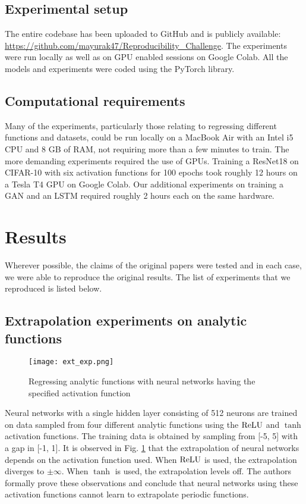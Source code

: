 \subsection{Experimental setup}

The entire codebase has been uploaded to GitHub and is publicly available: \url{https://github.com/mayurak47/Reproducibility_Challenge}. The experiments were run locally as well as on GPU enabled sessions on Google Colab. All the models and experiments were coded using the PyTorch library.

\subsection{Computational requirements}

Many of the experiments, particularly those relating to regressing different functions and datasets, could be run locally on a MacBook Air with an Intel i5 CPU and 8 GB of RAM, not requiring more than a few minutes to train. The more demanding experiments required the use of GPUs. Training a ResNet18 on CIFAR-10 with six activation functions for 100 epochs took roughly 12 hours on a Tesla T4 GPU on Google Colab. Our additional experiments on training a GAN and an LSTM required roughly 2 hours each on the same hardware. 

\section{Results}

Wherever possible, the claims of the original papers were tested and in each case, we were able to reproduce the original results. The list of experiments that we reproduced is listed below.

\subsection{Extrapolation experiments on analytic functions}

\begin{figure}[h]

\centering
\texttt{[image: ext\_exp.png]}
\caption{Regressing analytic functions with neural networks having the specified activation function}
\label{fig:extrapolation}
\end{figure}

Neural networks with a single hidden layer consisting of 512 neurons are trained on data sampled from four different analytic functions using the $ \operatorname{ReLU} $ and $ \tanh $ activation functions. The training data is obtained by sampling from [-5, 5] with a gap in [-1, 1]. It is observed in Fig. \ref{fig:extrapolation} that the extrapolation of neural networks depends on the activation function used. When $ \operatorname{ReLU} $ is used, the extrapolation diverges to $\pm \infty$. When $ \tanh $ is used, the extrapolation levels off. The authors formally prove these observations and conclude that neural networks using these activation functions cannot learn to extrapolate periodic functions.

